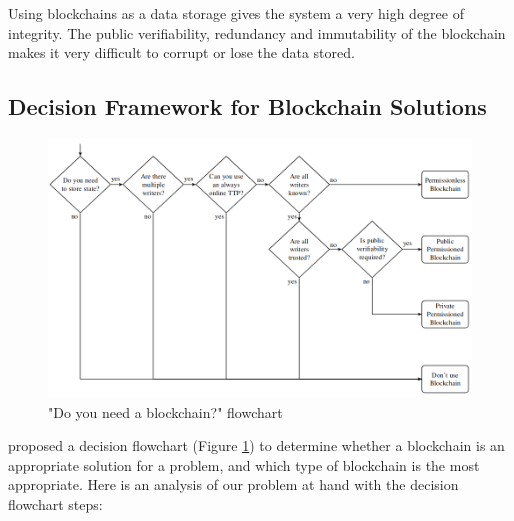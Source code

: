 Using blockchains as a data storage gives the system a very high degree of integrity. The public verifiability,
redundancy and immutability of the blockchain makes it very difficult to corrupt or lose the data stored.

\subsection{Decision Framework for Blockchain Solutions}

\begin{figure}[!ht]
	\centering
	\includegraphics[width=1.05\textwidth]{blockchain_need}
	\caption["Do you need a blockchain?" flowchart]
	{"Do you need a blockchain?" flowchart \citep[p.3]{wust2017you}}
	\label{fig:blockchain_need}
\end{figure}

\citet[p.3]{wust2017you} proposed a decision flowchart (Figure \ref{fig:blockchain_need}) to determine whether a blockchain is
an appropriate solution for a problem, and which type of blockchain is the most appropriate. Here is an analysis of our problem at
hand with the decision flowchart steps:


